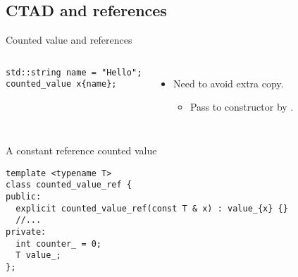 \subsection{CTAD and references}

\begin{frame}[t,fragile]{Counted value and references}

\begin{columns}[T]

\begin{block}{}
\begin{lstlisting}
std::string name = "Hello";
counted_value x{name};
\end{lstlisting}
\end{block}

\pause
{}
\begin{itemize}
  \item Need to avoid extra copy.
    \begin{itemize}
      \item Pass to constructor by .
    \end{itemize}
\end{itemize}

\end{columns}


\begin{block}{A constant reference counted value}
\begin{lstlisting}
template <typename T>
class counted_value_ref {
public:
  explicit counted_value_ref(const T & x) : value_{x} {}
  //...
private:
  int counter_ = 0;
  T value_;
};
\end{lstlisting}
\end{block}
\end{frame}

